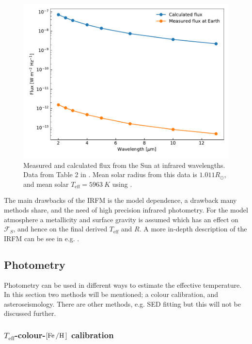 \begin{figure}[htpb!]
    \centering
    \includegraphics[width=1.0\linewidth]{figures/IRFM.pdf}
    \caption{Measured and calculated flux from the Sun at infrared wavelengths.
             Data from Table 2 in \citet{Blackwell1977}. Mean solar radius from
             this data is $1.011R_\odot$, and mean solar
             $T_\mathrm{eff}=\SI{5963}{K}$ using .}
    \label{fig:IRFM}
\end{figure}

The main drawbacks of the IRFM is the model dependence, a drawback many methods
share, and the need of high precision infrared photometry. For the model
atmosphere a metallicity and surface gravity is assumed which has an effect on
$\mathcal{F}_S$, and hence on the final derived $T_\mathrm{eff}$ and $R$. A more
in-depth description of the IRFM can be see in e.g.
\citet[][section 4]{Casagrande2006}.



\subsection{Photometry}

Photometry can be used in different ways to estimate the effective temperature.
In this section two methods will be mentioned; a colour calibration, and
asteroseismology. There are other methods, e.g. SED fitting but this will not
be discussed further.

\subsubsection{$T_\mathrm{eff}$-colour-$[\ion{Fe}/\ion{H}]$ calibration}

